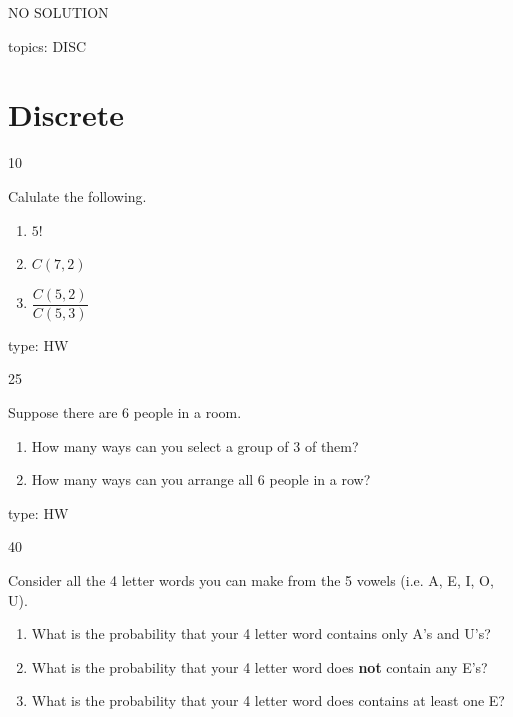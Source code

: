 \documentclass[12 pt]{article}
\begin{document}
\begin{itemize}
{\begin{enumerate}
\end{enumerate}



}
{
NO SOLUTION

}{}{topics: DISC}




\section{Discrete}


 \ex
{}{10}
{
Calulate the following. 

\begin{enumerate}

\item
$5!$

\item
$C(7, 2)$

\item
$\dfrac{C(5, 2)}{C(5,3)}$

\end{enumerate}

}{


}{}{type: HW}


 \ex
{}{25}
{
Suppose there are 6 people in a room.  

\begin{enumerate}

\item
How many ways can you select a group of 3 of them?

\item
How many ways can you arrange all 6 people in a row?

\end{enumerate}

}{


}{}{type: HW}


 \ex
{}{40}
{
Consider all the 4 letter words you can make from the 5 vowels (i.e. A, E, I, O, U).

\begin{enumerate}

\item
What is the probability that your 4 letter word contains only A's and U's?

\item
What is the probability that your 4 letter word does {\bf not} contain any E's?


\item
What is the probability that your 4 letter word does contains at least one E?



\end{enumerate}}
\end{itemize}
\end{document}
